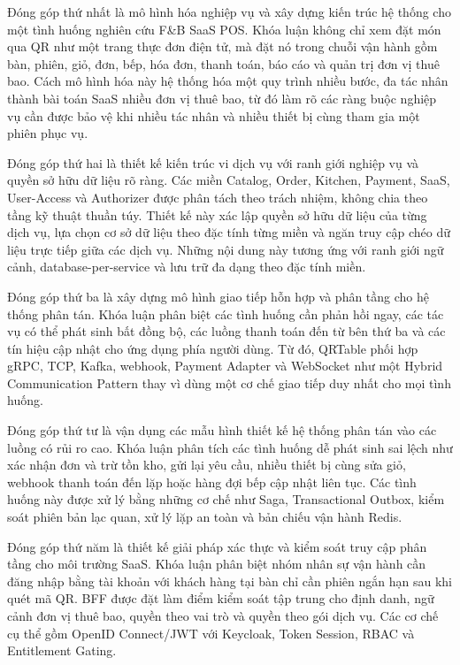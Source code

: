Đóng góp thứ nhất là mô hình hóa nghiệp vụ và xây dựng kiến trúc hệ thống cho một tình huống nghiên cứu F\&B SaaS POS. Khóa luận không chỉ xem đặt món qua QR như một trang thực đơn điện tử, mà đặt nó trong chuỗi vận hành gồm bàn, phiên, giỏ, đơn, bếp, hóa đơn, thanh toán, báo cáo và quản trị đơn vị thuê bao. Cách mô hình hóa này hệ thống hóa một quy trình nhiều bước, đa tác nhân thành bài toán SaaS nhiều đơn vị thuê bao, từ đó làm rõ các ràng buộc nghiệp vụ cần được bảo vệ khi nhiều tác nhân và nhiều thiết bị cùng tham gia một phiên phục vụ.

Đóng góp thứ hai là thiết kế kiến trúc vi dịch vụ với ranh giới nghiệp vụ và quyền sở hữu dữ liệu rõ ràng. Các miền Catalog, Order, Kitchen, Payment, SaaS, User-Access và Authorizer được phân tách theo trách nhiệm, không chia theo tầng kỹ thuật thuần túy. Thiết kế này xác lập quyền sở hữu dữ liệu của từng dịch vụ, lựa chọn cơ sở dữ liệu theo đặc tính từng miền và ngăn truy cập chéo dữ liệu trực tiếp giữa các dịch vụ. Những nội dung này tương ứng với ranh giới ngữ cảnh, database-per-service và lưu trữ đa dạng theo đặc tính miền.

Đóng góp thứ ba là xây dựng mô hình giao tiếp hỗn hợp và phân tầng cho hệ thống phân tán. Khóa luận phân biệt các tình huống cần phản hồi ngay, các tác vụ có thể phát sinh bất đồng bộ, các luồng thanh toán đến từ bên thứ ba và các tín hiệu cập nhật cho ứng dụng phía người dùng. Từ đó, QRTable phối hợp gRPC, TCP, Kafka, webhook, Payment Adapter và WebSocket như một Hybrid Communication Pattern thay vì dùng một cơ chế giao tiếp duy nhất cho mọi tình huống.

Đóng góp thứ tư là vận dụng các mẫu hình thiết kế hệ thống phân tán vào các luồng có rủi ro cao. Khóa luận phân tích các tình huống dễ phát sinh sai lệch như xác nhận đơn và trừ tồn kho, gửi lại yêu cầu, nhiều thiết bị cùng sửa giỏ, webhook thanh toán đến lặp hoặc hàng đợi bếp cập nhật liên tục. Các tình huống này được xử lý bằng những cơ chế như Saga, Transactional Outbox, kiểm soát phiên bản lạc quan, xử lý lặp an toàn và bản chiếu vận hành Redis.

Đóng góp thứ năm là thiết kế giải pháp xác thực và kiểm soát truy cập phân tầng cho môi trường SaaS. Khóa luận phân biệt nhóm nhân sự vận hành cần đăng nhập bằng tài khoản với khách hàng tại bàn chỉ cần phiên ngắn hạn sau khi quét mã QR. BFF được đặt làm điểm kiểm soát tập trung cho định danh, ngữ cảnh đơn vị thuê bao, quyền theo vai trò và quyền theo gói dịch vụ. Các cơ chế cụ thể gồm OpenID Connect/JWT với Keycloak, Token Session, RBAC và Entitlement Gating.

